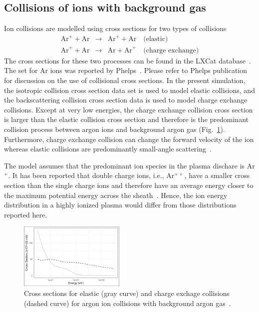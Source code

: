 \subsection{\label{IonCollision}Collisions of ions with background gas}
Ion collisions are modelled using cross sections for two types of collisions
\begin{eqnarray}
\text{Ar}^+ + \text{Ar} &\rightarrow& \text{Ar}^+ + \text{Ar} \quad \text{(elastic)} \\
\text{Ar}^+ + \text{Ar} &\rightarrow& \text{Ar} + \text{Ar}^+ \quad \text{(charge exchange)} 
\end{eqnarray}
The cross sections for these two processes can be found in the LXCat database~\cite{LXCat}. The set for Ar ions was reported by Phelps~\cite{Phelps1994}. Please refer to Phelps publication for discussion on the use of collisional cross sections. In the present simulation, the isotropic collision cross section data set is used to model elastic collisions, and the backscattering collision cross section data is used to model charge exchange collisions. Except at very low energies, the charge exchange collision cross section is larger than the elastic collision cross section and therefore is the predominant collision process between argon ions and background argon gas (Fig.~\ref{fig:CrossSectionsArgon}). Furthermore, charge exchange collision can change the forward velocity of the ion whereas elastic collisions are predominantly small-angle scattering~\cite{Davis1963}.

The model assumes that the predominant ion species in the plasma dischare is Ar$^+$. It has been reported that double charge ions, i.e., Ar$^{++}$, have a smaller cross section than the single charge ions and therefore have an average energy closer to the maximum potential energy across the sheath~\cite{Davis1963}. Hence, the ion energy distribution in a highly ionized plasma would differ from those distributions reported here.     
	
\begin{figure}[htbp]
\centering
\includegraphics[width=0.45\textwidth]{Figures/CrossSections.jpg}
\caption{Cross sections for elastic (gray curve) and charge exchage collisions (dashed curve) for argon ion collisions with background argon gas~\cite{Phelps1994,LXCat}.}
\label{fig:CrossSectionsArgon}
\end{figure}

